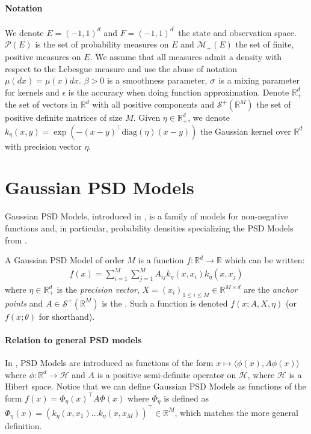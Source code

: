 \paragraph{Notation} We denote $E=(-1, 1)^d$ and $F = (-1, 1)^{d^\prime}$ the state and observation space. $\mathcal P(E)$ is the set of probability measures on $E$ and $\mathcal M_+(E)$ the set of finite, positive measures on $E$. We assume that all measures admit a density with respect to the Lebesgue measure and use the abuse of notation $\mu(dx)=\mu(x)dx$. $\beta>0$ is a smoothness parameter, $\sigma$ is a mixing parameter for kernels and $\epsilon$ is the accuracy when doing function approximation. Denote $\mathbb R^d_+$ the set of vectors in $\mathbb R^d$ with all positive components and $\mathcal S^+(\mathbb R^M)$ the set of positive definite matrices of size $M$. Given $\eta\in \mathbb R^d_+$, we denote $k_\eta(x, y) = \exp\left(- (x-y)^\top \textrm{diag}(\eta)(x-y)\right)$ the Gaussian kernel over $\mathbb R^d$ with precision vector $\eta$.

\section{Gaussian PSD Models}\label{sec:gaussian-psd-models}

Gaussian PSD Models, introduced in \cite{ciliberto2021}, is a family of models for non-negative functions and, in particular, probability densities specializing the PSD Models from \cite{ulysse-non-negative}.

\begin{definition}\label{def:psd-model}
   A Gaussian PSD Model of order $M$ is a function $f: \mathbb R^d \to \mathbb R$ which can be written:
   \begin{align}\label{eq:psd-model-def}
      f(x) = \sum_{i=1}^M\sum_{j=1}^M A_{ij}k_\eta(x, x_i)k_\eta(x, x_j)
   \end{align}
   where $\eta \in \mathbb R^d_+$ is the \emph{precision vector},  $X = (x_i)_{1\leq i \leq M}\in \mathbb R^{M\times d}$ are the \emph{anchor points} and $A\in\mathcal S^+(\mathbb R^M)$ is the . Such a function is denoted $f(x; A, X, \eta)$ (or $f(x;\theta)$ for shorthand).
\end{definition}


\paragraph{Relation to general PSD models} In \cite{ulysse-non-negative}, PSD Models are introduced as functions of the form $x \mapsto \langle\phi(x), A\phi(x)\rangle$ where $\phi: \mathbb R^d \to \mathcal H$ and $A$ is a positive semi-definite operator on $\mathcal H$, where $\mathcal H$ is a Hibert space. Notice that we can define Gaussian PSD Models as functions of the form $f(x) = \Phi_\eta(x)^\top A\Phi(x)$ where $\Phi_\eta$ is defined as $\Phi_\eta(x)= (k_\eta(x, x_1) \ldots k_\eta(x, x_M))^\top \in\mathbb R^M$, which matches the more general definition.

